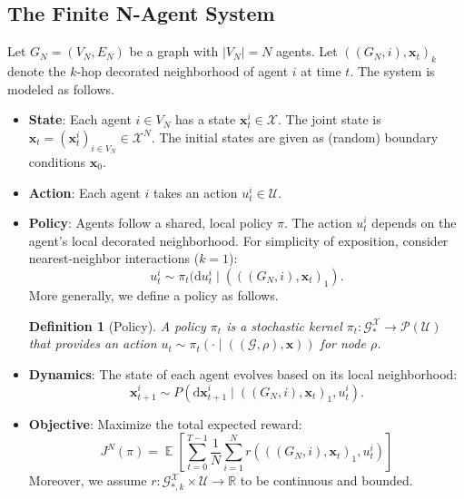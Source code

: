 \documentclass{article}
\newcommand{\E}{\operatorname{\mathbb E}}
\newtheorem{definition}{Definition}
\begin{document}
\subsection{The Finite N-Agent System}
Let $G_N = (V_N, E_N)$ be a graph with $|V_N|=N$ agents. Let $((G_N, i), \mathbf{x}_t)_k$ denote the $k$-hop decorated neighborhood of agent $i$ at time $t$. The system is modeled as follows.
\begin{itemize}[noitemsep,topsep=0pt]
    \item \textbf{State}: Each agent $i \in V_N$ has a state $\mathbf x_t^i \in \mathcal{X}$. The joint state is $\mathbf{x}_t = (\mathbf x_t^i)_{i \in V_N} \in \mathcal{X}^N$. The initial states are given as (random) boundary conditions $\mathbf x_0$.
    \item \textbf{Action}: Each agent $i$ takes an action $u_t^i \in \mathcal{U}$.
    \item \textbf{Policy}: Agents follow a shared, local policy $\pi$. The action $u_t^i$ depends on the agent's local decorated neighborhood. For simplicity of exposition, consider nearest-neighbor interactions ($k=1$):
    \begin{equation}
        \label{equ:action_kernel_sample}
        u_t^i \sim \pi_t( \mathrm du_t^i \mid (((G_N, i), \mathbf{x}_t)_1).
    \end{equation}
    More generally, we define a policy as follows.
\begin{definition}[Policy]
A policy $\pi_t$ is a stochastic kernel $\pi_t: \mathcal{G}_*^{\mathcal{X}} \to \mathcal{P}(\mathcal{U})$ that provides an action $u_t \sim \pi_t(\cdot \mid ((\mathcal{G}, \rho), \mathbf{x}))$ for node $\rho$.
\end{definition}
    \item \textbf{Dynamics}: The state of each agent evolves based on its local neighborhood:
    \begin{equation}
        \label{equ:state_kernel_sample}
        \mathbf x_{t+1}^i \sim P( \mathrm d \mathbf x_{t+1}^i \mid ((G_N, i), \mathbf{x}_t)_1, u_t^i).
    \end{equation}
    \item \textbf{Objective}: Maximize the total expected reward:
    \begin{equation}
        \label{equ:finite_agent_rewards}
        J^N(\pi) = \E \left[ \sum_{t=0}^{T-1} \frac{1}{N} \sum_{i=1}^N r(((G_N, i), \mathbf{x}_t)_1, u_t^i) \right]
    \end{equation}
    Moreover, we assume $r: \mathcal G^{\mathcal X}_{*,k} \times \mathcal U \to \mathbb R$ to be continuous and bounded.
\end{itemize}
\end{document}
